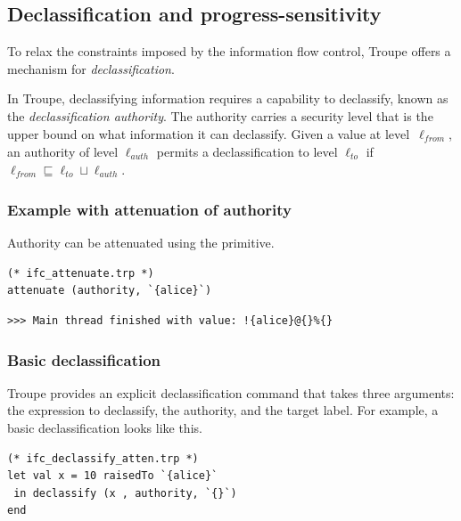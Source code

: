 \subsection{Declassification and progress-sensitivity}
\label{sec:declassification}
To relax the constraints imposed by the information flow control, Troupe offers 
a mechanism for \emph{declassification}. 

In Troupe, declassifying information requires a capability to declassify,
known as the \emph{declassification authority}. 
The authority carries a security level that is the upper bound 
on what information it can declassify. 
%
Given  a value at 
level~$\ell_{\mathit{from}}$, an authority of 
level $\ell_{\mathit{auth}}$ permits a declassification to level 
$\ell_{\mathit{to}}$ if
${\ell_{\mathit{from}}} \sqsubseteq {  \ell_{\mathit{to}} \sqcup \ell_{\mathit{auth}}}.$



\subsubsection{Example with attenuation of authority}
Authority can be attenuated using the  primitive. 

\begin{lstlisting}
(* ifc_attenuate.trp *)
attenuate (authority, `{alice}`)    
\end{lstlisting}
\begin{verbatim}
>>> Main thread finished with value: !{alice}@{}%{}    
\end{verbatim}

\subsubsection{Basic declassification}
Troupe provides an explicit declassification command  that takes three arguments: 
the expression to declassify, the authority, and the target label. For example, a basic declassification
looks like this. 
\begin{lstlisting}
(* ifc_declassify_atten.trp *)
let val x = 10 raisedTo `{alice}`
 in declassify (x , authority, `{}`)
end 
\end{lstlisting}

